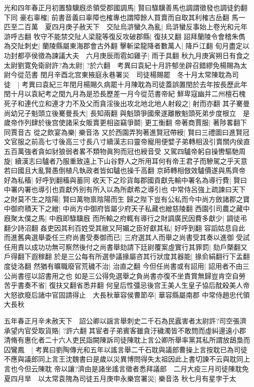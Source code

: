 光和四年春正月初置騄驥廐丞領受郡國調馬|{
	賢曰騄驥善馬也調謂徵發也調徒釣翻下同}
豪右辜榷|{
	前書音義曰辜障也榷專也謂障餘人買賣而自取其利榷古岳翻}
馬一匹至二百萬　夏四月庚子赦天下　交阯烏滸蠻久為亂|{
	烏滸蠻反事始上卷光和元年滸呼古翻}
牧守不能禁交阯人梁龍等復反攻破郡縣|{
	復扶又翻}
詔拜蘭陵令會稽朱儁為交阯刺史|{
	蘭陵縣屬東海郡會古外翻}
擊斬梁龍降者數萬人|{
	降戶江翻}
旬月盡定以功封都亭侯徵為諫議大夫　六月庚辰雨雹如雞子|{
	雨于具翻}
秋九月庚寅朔日有食之　太尉劉寛免衛尉許?為太尉|{
	?於六翻　考異曰袁紀十月許郁坐辟召錯繆免楊賜為太尉今從范書}
閏月辛酉北宫東掖庭永巷署災　司徒楊賜罷　冬十月太常陳耽為司徒　|{
	考異曰袁紀三年閏月楊賜久病罷十月陳耽為司徒蓋誤置閏於去年按長歷此年閏十月以袁紀考之閠九月為是恐長歷差一月今從范書帝紀}
鮮卑寇幽并二州檀石槐死子和連代立和連才力不及父而貪淫後出攻北地北地人射殺之|{
	射而亦翻}
其子騫曼尚幼兄子魁頭立後騫曼長大|{
	長知兩翻}
與魁頭爭國衆遂離散魁頭死弟步度根立　是歲帝作列肆於後宫使諸采女販賣更相盜竊爭鬬|{
	更工衡翻}
帝著商賈服|{
	著陟畧翻下同賈音古}
從之飲宴為樂|{
	樂音洛}
又於西園弄狗著進賢冠帶綬|{
	賢曰三禮圖曰進賢冠文官服之前高七寸後高三寸長八寸續漢志曰靈帝寵用便嬖子弟轉相汲引賣關内侯直五百萬強者貪如豺狼弱者畧不類物眞狗而冠也綬音受}
又駕四驢帝躬自操轡驅馳周旋|{
	續漢志曰驢者乃服重致遠上下山谷野人之所用耳何有帝王君子而驂駕之乎天意若曰國且大亂賢愚倒植凡執政者皆如驢也操千高翻}
京師轉相倣效驢價遂與馬齊帝好為私稸|{
	好呼到翻稸與蓄同}
收天下之珍貨每郡國貢獻先輸中署名為導行費|{
	賢曰中署内署也導引也貢獻外别有所入以為所獻希之導引也}
中常侍呂強上疏諫曰天下之財莫不生之陰陽|{
	賢曰萬物禀陰陽而生}
歸之陛下豈有公私而今中尚方斂諸郡之寶中御府積天下之繒|{
	中尚方中御府皆屬少府天子私藏也繒慈陵翻}
西園引司農之藏中廐聚太僕之馬|{
	中廐即騄驥廐}
而所輸之府輒有導行之財調廣民因費多獻少|{
	調徒弔翻少詩沼翻}
姦吏因其利百姓受其敝又阿媚之臣好獻其私|{
	好呼到翻}
容謟姑息自此而進舊典選舉委任三府尚書受奏御而已|{
	三府選其人而舉之尚書受其奏以進御}
受試任用責以成功功無可察然後付之尚書舉劾請下廷尉覆案虛實行其罪罰|{
	劾戶槩翻又戶得翻下遐稼翻}
於是三公每有所選參議掾屬咨其行狀度其器能|{
	掾俞絹翻行下孟翻度徒洛翻}
然猶有曠職廢官荒穢不治|{
	治直之翻}
今但任尚書或有詔用|{
	詔用者不由三公尚書徑以詔書用之也}
如是三公得免選舉之負尚書亦復不坐責賞無歸豈肯空自勞苦乎書奏不省|{
	復扶又翻省悉井翻}
何皇后性彊忌後宫王美人生皇子協后酖殺美人帝大怒欲廢后諸中官固請得止　大長秋華容侯曹節卒|{
	華容縣屬南郡}
中常侍趙忠代領大長秋

五年春正月辛未赦天下　詔公卿以謡言舉刺史二千石為民蠧害者太尉許?司空張濟承望内官受取貨賂|{
	?許六翻}
其宦者子弟賓客雖貪汙穢濁皆不敢問而虛糾邊遠小郡清脩有惠化者二十六人吏民詣闕陳訴司徒陳耽上言公卿所舉率黨其私所謂放鴟梟而囚鸞鳳　|{
	考異曰劉陶傳光和五年以謠言舉二千石耽與議郎曹操上言按耽已為司徒不應與議郎同上言王沈魏書曰是歲以災異博問得失太祖因此上書切諫不云與耽同上言也今但云陳耽}
帝以讓?濟由是諸坐謠言徵者悉拜議郎　二月大疫三月司徒陳耽免　夏四月旱　以太常袁隗為司徒五月庚申永樂宫署災|{
	樂音洛}
秋七月有星孛于太

